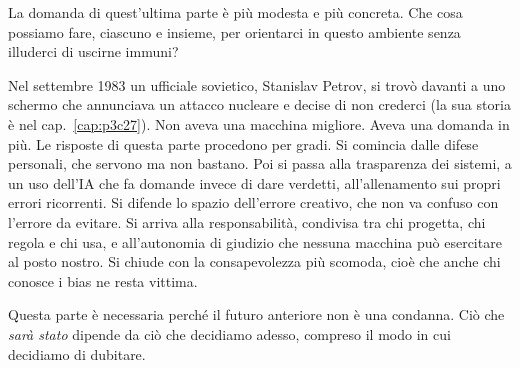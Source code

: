 La domanda di quest'ultima parte è più modesta e più concreta. Che cosa possiamo fare, ciascuno e insieme, per orientarci in questo ambiente senza illuderci di uscirne immuni?

Nel settembre 1983 un ufficiale sovietico, Stanislav Petrov, si trovò davanti a uno schermo che annunciava un attacco nucleare e decise di non crederci (la sua storia è nel cap.~\ref{cap:p3c27}). Non aveva una macchina migliore. Aveva una domanda in più. Le risposte di questa parte procedono per gradi. Si comincia dalle difese personali, che servono ma non bastano. Poi si passa alla trasparenza dei sistemi, a un uso dell'IA che fa domande invece di dare verdetti, all'allenamento sui propri errori ricorrenti. Si difende lo spazio dell'errore creativo, che non va confuso con l'errore da evitare. Si arriva alla responsabilità, condivisa tra chi progetta, chi regola e chi usa, e all'autonomia di giudizio che nessuna macchina può esercitare al posto nostro. Si chiude con la consapevolezza più scomoda, cioè che anche chi conosce i bias ne resta vittima.

Questa parte è necessaria perché il futuro anteriore non è una condanna. Ciò che \textit{sarà stato} dipende da ciò che decidiamo adesso, compreso il modo in cui decidiamo di dubitare.

\cleardoublepage
